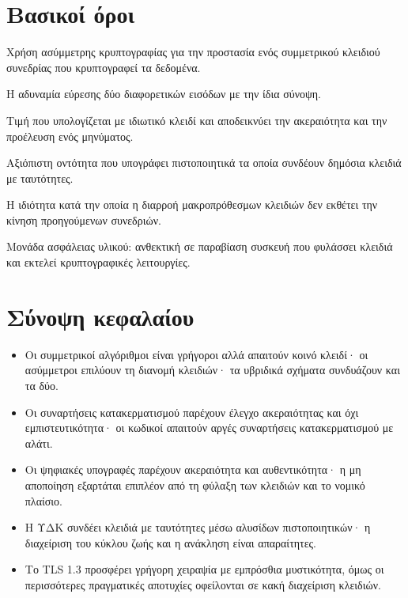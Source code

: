 \documentclass[11pt,openany]{book}
\begin{document}
\section*{Βασικοί όροι}
\begin{description}[style=nextline,leftmargin=1.2em]
  \item[Υβριδική κρυπτογράφηση] Χρήση ασύμμετρης κρυπτογραφίας για την προστασία ενός συμμετρικού κλειδιού συνεδρίας που κρυπτογραφεί τα δεδομένα.
  \item[Αντίσταση συγκρούσεων] Η αδυναμία εύρεσης δύο διαφορετικών εισόδων με την ίδια σύνοψη.
  \item[Ψηφιακή υπογραφή] Τιμή που υπολογίζεται με ιδιωτικό κλειδί και αποδεικνύει την ακεραιότητα και την προέλευση ενός μηνύματος.
  \item[Αρχή πιστοποίησης] Αξιόπιστη οντότητα που υπογράφει πιστοποιητικά τα οποία συνδέουν δημόσια κλειδιά με ταυτότητες.
  \item[Εμπρόσθια μυστικότητα] Η ιδιότητα κατά την οποία η διαρροή μακροπρόθεσμων κλειδιών δεν εκθέτει την κίνηση προηγούμενων συνεδριών.
  \item[HSM] Μονάδα ασφάλειας υλικού: ανθεκτική σε παραβίαση συσκευή που φυλάσσει κλειδιά και εκτελεί κρυπτογραφικές λειτουργίες.
\end{description}

\section*{Σύνοψη κεφαλαίου}
\begin{itemize}
  \item Οι συμμετρικοί αλγόριθμοι είναι γρήγοροι αλλά απαιτούν κοινό κλειδί· οι ασύμμετροι επιλύουν τη διανομή κλειδιών· τα υβριδικά σχήματα συνδυάζουν και τα δύο.
  \item Οι συναρτήσεις κατακερματισμού παρέχουν έλεγχο ακεραιότητας και όχι εμπιστευτικότητα· οι κωδικοί απαιτούν αργές συναρτήσεις κατακερματισμού με αλάτι.
  \item Οι ψηφιακές υπογραφές παρέχουν ακεραιότητα και αυθεντικότητα· η μη αποποίηση εξαρτάται επιπλέον από τη φύλαξη των κλειδιών και το νομικό πλαίσιο.
  \item Η ΥΔΚ συνδέει κλειδιά με ταυτότητες μέσω αλυσίδων πιστοποιητικών· η διαχείριση του κύκλου ζωής και η ανάκληση είναι απαραίτητες.
  \item Το TLS 1.3 προσφέρει γρήγορη χειραψία με εμπρόσθια μυστικότητα, όμως οι περισσότερες πραγματικές αποτυχίες οφείλονται σε κακή διαχείριση κλειδιών.
\end{itemize}
\end{document}
